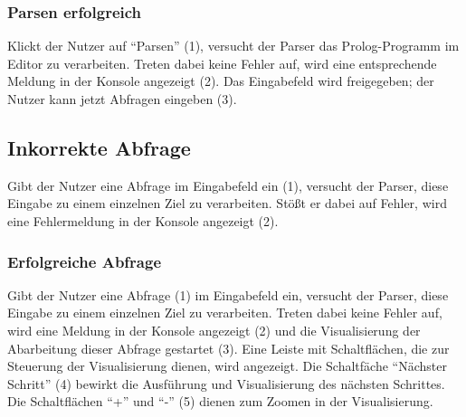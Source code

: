 \documentclass[parskip=full,11pt,twoside]{scrartcl}
\begin{document}
\subsubsection{Parsen erfolgreich}

\begin{minipage}{\linewidth}
\end{minipage}

Klickt der Nutzer auf \enquote{Parsen} (1), versucht der Parser das Prolog-Programm im Editor zu verarbeiten.
Treten dabei keine Fehler auf, wird eine entsprechende Meldung in der Konsole angezeigt (2).
Das Eingabefeld wird freigegeben; der Nutzer kann jetzt Abfragen eingeben (3).

\subsection{Inkorrekte Abfrage}

\begin{minipage}{\linewidth}
\end{minipage}

Gibt der Nutzer eine Abfrage im Eingabefeld ein (1), versucht der Parser, diese Eingabe zu einem einzelnen Ziel zu verarbeiten.
Stößt er dabei auf Fehler, wird eine Fehlermeldung in der Konsole angezeigt (2).

\subsubsection{Erfolgreiche Abfrage}

\begin{minipage}{\linewidth}
\end{minipage}

Gibt der Nutzer eine Abfrage (1) im Eingabefeld ein, versucht der Parser, diese Eingabe zu einem einzelnen Ziel zu verarbeiten.
Treten dabei keine Fehler auf, wird eine Meldung in der Konsole angezeigt (2) und die Visualisierung der Abarbeitung dieser Abfrage gestartet (3).
Eine Leiste mit Schaltflächen, die zur Steuerung der Visualisierung dienen, wird angezeigt.
Die Schaltfäche \enquote{Nächster Schritt} (4) bewirkt die Ausführung und Visualisierung des nächsten Schrittes.
Die Schaltflächen \enquote{+} und \enquote{-} (5) dienen zum Zoomen in der Visualisierung.
\end{document}
